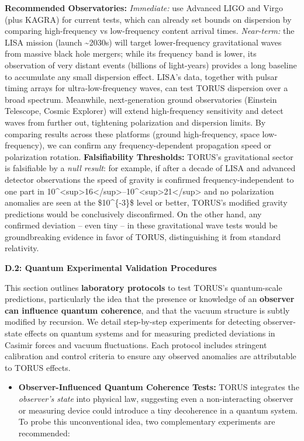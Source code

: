 \textbf{Recommended Observatories:} \emph{Immediate:} use Advanced LIGO
and Virgo (plus KAGRA) for current tests, which can already set bounds
on dispersion by comparing high-frequency vs low-frequency content
arrival times​. \emph{Near-term:} the LISA mission (launch
\textasciitilde{}2030s) will target lower-frequency gravitational waves
from massive black hole mergers; while its frequency band is lower, its
observation of very distant events (billions of light-years) provides a
long baseline to accumulate any small dispersion effect​. LISA's data,
together with pulsar timing arrays for ultra-low-frequency waves, can
test TORUS dispersion over a broad spectrum. Meanwhile, next-generation
ground observatories (Einstein Telescope, Cosmic Explorer) will extend
high-frequency sensitivity and detect waves from further out, tightening
polarization and dispersion limits. By comparing results across these
platforms (ground high-frequency, space low-frequency), we can confirm
any frequency-dependent propagation speed or polarization rotation.
\textbf{Falsifiability Thresholds:} TORUS's gravitational sector is
falsifiable by a \emph{null result}: for example, if after a decade of
LISA and advanced detector observations the speed of gravity is
confirmed frequency-independent to one part in
10\^{}\textless{}sup\textgreater{}16\textless{}/sup\textgreater{}--10\^{}\textless{}sup\textgreater{}21\textless{}/sup\textgreater{}
and no polarization anomalies are seen at the \$10\^{}\{-3\}\$ level or
better, TORUS's modified gravity predictions would be conclusively
disconfirmed​. On the other hand, any confirmed deviation -- even tiny
-- in these gravitational wave tests would be groundbreaking evidence in
favor of TORUS, distinguishing it from standard relativity.

\textbf{D.2: Quantum Experimental Validation Procedures}

This section outlines \textbf{laboratory protocols} to test TORUS's
quantum-scale predictions, particularly the idea that the presence or
knowledge of an \textbf{observer can influence quantum coherence}, and
that the vacuum structure is subtly modified by recursion. We detail
step-by-step experiments for detecting observer-state effects on quantum
systems and for measuring predicted deviations in Casimir forces and
vacuum fluctuations. Each protocol includes stringent calibration and
control criteria to ensure any observed anomalies are attributable to
TORUS effects.

\begin{itemize}
\item
  \textbf{Observer-Influenced Quantum Coherence Tests:} TORUS integrates
  the \emph{observer's state} into physical law, suggesting even a
  non-interacting observer or measuring device could introduce a tiny
  decoherence in a quantum system​. To probe this unconventional idea,
  two complementary experiments are recommended:
\end{itemize}

